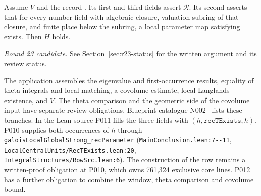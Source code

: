 \begin{formalstatement}\label{pn:P012}
Assume $V$ and the record . Its first and third fields assert $\mathcal R$. Its second asserts that for every number field with algebraic closure, valuation subring of that closure, and finite place below the subring, a local parameter map satisfying  exists. Then $H$ holds.
\end{formalstatement}
 \noindent\emph{Round 23 candidate.} See Section~\ref{sec:r23-status} for the written argument and its review status.\par
The application assembles the eigenvalue and first-occurrence results, equality of theta integrals and local matching, a covolume estimate, local Langlands existence, and $V$. The theta comparison and the geometric side of the covolume input have separate review obligations. Blueprint catalogue N002~ lists these branches. In the Lean source P011 fills the three fields with $(h,\texttt{recTExists},h)$. P010 supplies both occurrences of $h$ through \nolinkurl{galoisLocalGlobalStrong_recParameter} (\nolinkurl{MainConclusion.lean:7--11}, \nolinkurl{LocalCentralUnits/RecTExists.lean:20}, \nolinkurl{IntegralStructures/RowSrc.lean:6}). The construction of the row remains a written-proof obligation at P010, which owns 761,324 exclusive core lines. P012 has a further obligation to combine the window, theta comparison and covolume bound.
